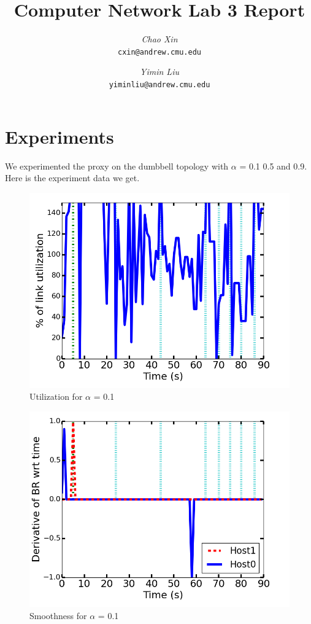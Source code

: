 \documentclass[12pt]{article}
\title{Computer Network Lab 3 Report}
\author{
    {\em Chao Xin} \\
    {\tt cxin@andrew.cmu.edu}
    \and
    {\em Yimin Liu} \\
    {\tt yiminliu@andrew.cmu.edu}
}
\date{}
\begin{document}
\maketitle

\section{Experiments}

We experimented the proxy on the dumbbell topology with $\alpha$ = 0.1 0.5 and 0.9. Here is the experiment data we get.\\

\begin{figure}
\centering
\includegraphics[scale = 0.75]{exp1/utilization.png}
\caption{Utilization for $\alpha$ = 0.1}
\end{figure}

\begin{figure}
\centering
\includegraphics[scale = 0.75]{exp1/smoothness.png}
\caption{Smoothness for $\alpha$ = 0.1}
\end{figure}
\end{document}
